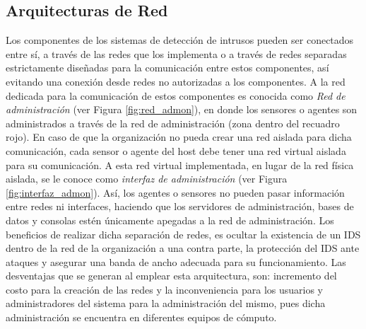 \subsection{Arquitecturas de Red}

Los componentes de los sistemas de detección de intrusos pueden ser conectados entre sí, a través de las redes que los implementa o a través de redes separadas estrictamente diseñadas para la comunicación entre estos componentes, así evitando una conexión desde redes no autorizadas a los componentes. A la red dedicada para la comunicación de estos componentes es conocida como \textit{Red de administración} (ver Figura \ref{fig:red_admon}), en donde los sensores o agentes son administrados a través de la red de administración (zona dentro del recuadro rojo). En caso de que la organización no pueda crear una red aislada para dicha comunicación, cada sensor o agente del host debe tener una red virtual aislada para su comunicación. A esta red virtual implementada, en lugar de la red física aislada, se le conoce como \textit{interfaz de administración} (ver Figura \ref{fig:interfaz_admon}). Así, los agentes o sensores no pueden pasar información entre redes ni interfaces, haciendo que los servidores de administración, bases de datos y consolas estén únicamente apegadas a la red de administración. Los beneficios de realizar dicha separación de redes, es ocultar la existencia de un IDS dentro de la red de la organización a una contra parte, la protección del IDS ante ataques y asegurar una banda de ancho adecuada para su funcionamiento. Las desventajas que se generan al emplear esta arquitectura, son: incremento del costo para la creación de las redes y la inconveniencia para los usuarios y administradores del sistema para la administración del mismo, pues dicha administración se encuentra en diferentes equipos de cómputo.
	
